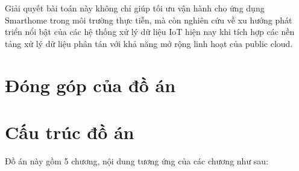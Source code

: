 Giải quyết bài toán này không chỉ giúp tối ưu vận hành cho ứng dụng Smarthome trong môi trường thực tiễn, mà còn nghiên cứu về xu hướng phát triển nổi bật của các hệ thống xử lý dữ liệu IoT hiện nay khi tích hợp các nền tảng xử lý dữ liệu phân tán với khả năng mở rộng linh hoạt của public cloud.

\section{Đóng góp của đồ án}


\section{Cấu trúc đồ án}

Đồ án này gồm 5 chương, nội dung tương ứng của các chương như sau:

